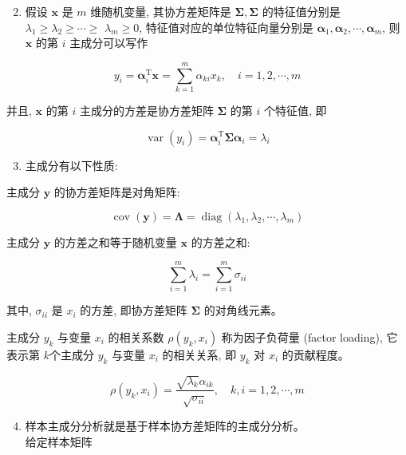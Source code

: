 \documentclass[10pt]{article}
\begin{document}
\begin{enumerate}
  \setcounter{enumi}{1}
  \item 假设 $\boldsymbol{x}$ 是 $m$ 维随机变量, 其协方差矩阵是 $\boldsymbol{\Sigma}, \boldsymbol{\Sigma}$ 的特征值分别是 $\lambda_{1} \geqslant \lambda_{2} \geqslant \cdots \geqslant$ $\lambda_{m} \geqslant 0$, 特征值对应的单位特征向量分别是 $\boldsymbol{\alpha}_{1}, \boldsymbol{\alpha}_{2}, \cdots, \boldsymbol{\alpha}_{m}$, 则 $\boldsymbol{x}$ 的第 $i$ 主成分可以写作
\end{enumerate}

$$
y_{i}=\boldsymbol{\alpha}_{i}^{\mathrm{T}} \boldsymbol{x}=\sum_{k=1}^{m} \alpha_{k i} x_{k}, \quad i=1,2, \cdots, m
$$

并且, $\boldsymbol{x}$ 的第 $i$ 主成分的方差是协方差矩阵 $\boldsymbol{\Sigma}$ 的第 $i$ 个特征值, 即

$$
\operatorname{var}\left(y_{i}\right)=\boldsymbol{\alpha}_{i}^{\mathrm{T}} \boldsymbol{\Sigma} \boldsymbol{\alpha}_{i}=\lambda_{i}
$$

\begin{enumerate}
  \setcounter{enumi}{2}
  \item 主成分有以下性质:
\end{enumerate}

主成分 $\boldsymbol{y}$ 的协方差矩阵是对角矩阵:

$$
\operatorname{cov}(\boldsymbol{y})=\boldsymbol{\Lambda}=\operatorname{diag}\left(\lambda_{1}, \lambda_{2}, \cdots, \lambda_{m}\right)
$$

主成分 $\boldsymbol{y}$ 的方差之和等于随机变量 $\boldsymbol{x}$ 的方差之和:

$$
\sum_{i=1}^{m} \lambda_{i}=\sum_{i=1}^{m} \sigma_{i i}
$$

其中, $\sigma_{i i}$ 是 $x_{i}$ 的方差, 即协方差矩阵 $\boldsymbol{\Sigma}$ 的对角线元素。

主成分 $y_{k}$ 与变量 $x_{i}$ 的相关系数 $\rho\left(y_{k}, x_{i}\right)$ 称为因子负荷量 (factor loading), 它表示第 $k$个主成分 $y_{k}$ 与变量 $x_{i}$ 的相关关系, 即 $y_{k}$ 对 $x_{i}$ 的贡献程度。

$$
\rho\left(y_{k}, x_{i}\right)=\frac{\sqrt{\lambda_{k}} \alpha_{i k}}{\sqrt{\sigma_{i i}}}, \quad k, i=1,2, \cdots, m
$$

\begin{enumerate}
  \setcounter{enumi}{3}
  \item 样本主成分分析就是基于样本协方差矩阵的主成分分析。\\
给定样本矩阵
\end{enumerate}
\end{document}
